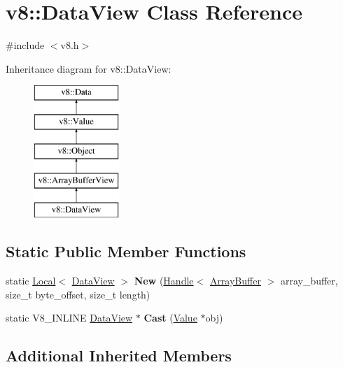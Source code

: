 \hypertarget{classv8_1_1_data_view}{}\section{v8\+:\+:Data\+View Class Reference}
\label{classv8_1_1_data_view}


{\ttfamily \#include $<$v8.\+h$>$}

Inheritance diagram for v8\+:\+:Data\+View\+:\begin{figure}[H]
\begin{center}
\leavevmode
\includegraphics[height=5.000000cm]{classv8_1_1_data_view}
\end{center}
\end{figure}
\subsection*{Static Public Member Functions}
\begin{DoxyCompactItemize}
\item 
\hypertarget{classv8_1_1_data_view_a5157c044dbb50669bc2977ea7482aa32}{}static \hyperlink{classv8_1_1_local}{Local}$<$ \hyperlink{classv8_1_1_data_view}{Data\+View} $>$ {\bfseries New} (\hyperlink{classv8_1_1_local}{Handle}$<$ \hyperlink{classv8_1_1_array_buffer}{Array\+Buffer} $>$ array\+\_\+buffer, size\+\_\+t byte\+\_\+offset, size\+\_\+t length)\label{classv8_1_1_data_view_a5157c044dbb50669bc2977ea7482aa32}

\item 
\hypertarget{classv8_1_1_data_view_aa97d15fcb28c6c002a52d32877c8fd3a}{}static V8\+\_\+\+I\+N\+L\+I\+N\+E \hyperlink{classv8_1_1_data_view}{Data\+View} $\ast$ {\bfseries Cast} (\hyperlink{classv8_1_1_value}{Value} $\ast$obj)\label{classv8_1_1_data_view_aa97d15fcb28c6c002a52d32877c8fd3a}

\end{DoxyCompactItemize}
\subsection*{Additional Inherited Members}


